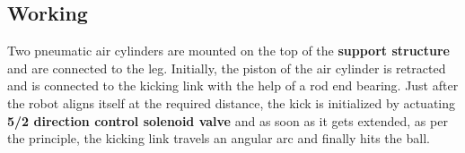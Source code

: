     \subsection{Working}
        Two pneumatic air cylinders are mounted on the top of the \textbf{support structure} and are connected to the leg. Initially, the 
        piston of the air cylinder is retracted and is connected to the kicking link with the help of a rod end bearing. Just after the robot
        aligns itself at the required distance, the kick is initialized by actuating \textbf{5/2 direction control solenoid valve} and as soon
        as it gets extended, as per the principle, the kicking link travels an angular arc and finally hits the ball.

